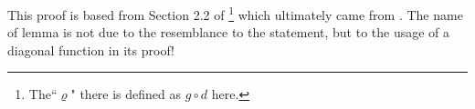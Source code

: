 \documentclass{article}
\begin{document}
This proof is based from Section 2.2 of \cite{salehi} \footnote{The``$\varrho$" there is defined as $g \circ d$ here.} which ultimately came from \cite{jeroslow}. The name of lemma is not due to the resemblance to the statement, but to the usage of a diagonal function in its proof!



\end{document}
